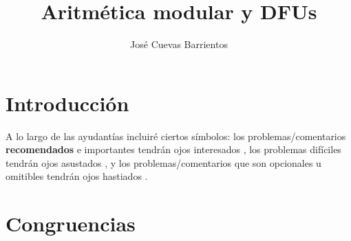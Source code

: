 \documentclass[11pt, reqno]{amsart}
\title{Aritmética modular y DFUs}
\date{\DTMdate{2025-08-11}}
\author[José Cuevas]{José Cuevas Barrientos}
\begin{document}
\maketitle

\section*{Introducción}
A lo largo de las ayudantías incluiré ciertos símbolos:
los problemas/comentarios \textbf{recomendados} e importantes tendrán ojos interesados {\righteyes}, 
los problemas difíciles tendrán ojos asustados {\straighteyes}, y
los problemas/comentarios que son opcionales u omitibles tendrán ojos hastiados {\upeyes}.

\section{Congruencias}
\end{document}
